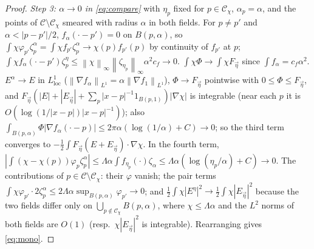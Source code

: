 \documentclass[11pt,reqno]{amsart}
\numberwithin{equation}{section}
\theoremstyle{plain}
\theoremstyle{definition}
\newcommand{\norm}[1]{\left\|#1\right\|}
\begin{document}
\begin{proof}
\emph{Step 3: $\alpha\to0$ in \eqref{eq:compare}} with $\eta_p$ fixed for $p\in\mathcal C_\chi$, $\alpha_p=\alpha$, and the points of $\mathcal C\setminus\mathcal C_\chi$ smeared with radius $\alpha$ in both fields.  For $p\ne p'$ and $\alpha<|p-p'|/2$, $f_{\alpha}(\cdot-p')=0$ on $B(p,\alpha)$, so $\int\chi\varphi_{p'}\zeta^\alpha_p=\int\chi f_{p'}\zeta^\alpha_p\to\chi(p)f_{p'}(p)$ by continuity of $f_{p'}$ at $p$; $\int\chi f_\alpha(\cdot-p')\zeta^\eta_p\le\norm\chi_\infty\norm{\zeta_{\eta_p}}_\infty\alpha^2c_f\to0$.  $\int\chi\Phi\to\int\chi F_{\vec\eta}$ since $\int f_\alpha=c_f\alpha^2$.  $E^\alpha\to E$ in $L^1_{\mathrm{loc}}$ ($\norm{\nabla f_\alpha}_{L^1}=\alpha\norm{\nabla f_1}_{L^1}$), $\Phi\to F_{\vec\eta}$ pointwise with $0\le\Phi\le F_{\vec\eta}$, and $F_{\vec\eta}(|E|+|E_{\vec\eta}|+\sum_p|x-p|^{-1}1_{B(p,1)})|\nabla\chi|$ is integrable (near each $p$ it is $O(\log(1/|x-p|)|x-p|^{-1})$); also $\int_{B(p,\alpha)}\Phi|\nabla f_\alpha(\cdot-p)|\le2\pi\alpha(\log(1/\alpha)+C)\to0$; so the third term converges to $-\frac12\int F_{\vec\eta}(E+E_{\vec\eta})\cdot\nabla\chi$.  In the fourth term, $|\int(\chi-\chi(p))\varphi_p\zeta^\alpha_p|\le\Lambda\alpha\int f_{\eta_p}(\cdot)\zeta_\alpha\le\Lambda\alpha(\log(\eta_p/\alpha)+C)\to0$.  The contributions of $p\in\mathcal C\setminus\mathcal C_\chi$: their $\varphi$ vanish; the pair terms $\int\chi\varphi_{p'}\cdot2\zeta^\alpha_p\le2\Lambda\alpha\sup_{B(p,\alpha)}\varphi_{p'}\to0$; and $\frac12\int\chi|E^\eta|^2\to\frac12\int\chi|E_{\vec\eta}|^2$ because the two fields differ only on $\bigcup_{p\notin\mathcal C_\chi}B(p,\alpha)$, where $\chi\le\Lambda\alpha$ and the $L^2$ norms of both fields are $O(1)$ (resp.\ $\chi|E_{\vec\eta}|^2$ is integrable).  Rearranging gives \eqref{eq:mono}.
\end{proof}
\end{document}
